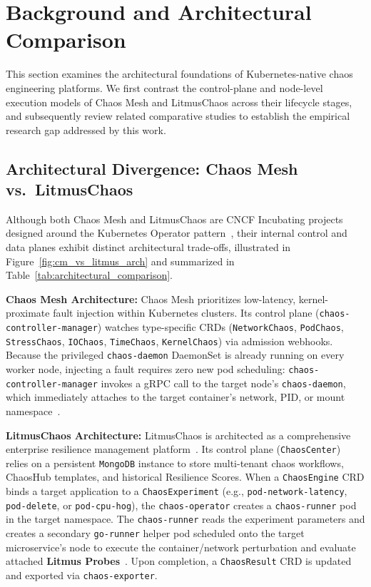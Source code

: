 \section{Background and Architectural Comparison}
\label{sec:background}

This section examines the architectural foundations of Kubernetes-native chaos engineering platforms. We first contrast the control-plane and node-level execution models of Chaos Mesh and LitmusChaos across their lifecycle stages, and subsequently review related comparative studies to establish the empirical research gap addressed by this work.

\subsection{Architectural Divergence: Chaos Mesh vs.\ LitmusChaos}
Although both Chaos Mesh and LitmusChaos are CNCF Incubating projects designed around the Kubernetes Operator pattern~\cite{owotogbe2026tenyears, onkalo2025improving}, their internal control and data planes exhibit distinct architectural trade-offs, illustrated in Figure~\ref{fig:cm_vs_litmus_arch} and summarized in Table~\ref{tab:architectural_comparison}.





\textbf{Chaos Mesh Architecture:} Chaos Mesh prioritizes low-latency, kernel-proximate fault injection within Kubernetes clusters. Its control plane (\texttt{chaos-controller-manager}) watches type-specific CRDs (\texttt{NetworkChaos}, \texttt{PodChaos}, \texttt{StressChaos}, \texttt{IOChaos}, \texttt{TimeChaos}, \texttt{KernelChaos}) via admission webhooks. Because the privileged \texttt{chaos-daemon} DaemonSet is already running on every worker node, injecting a fault requires zero new pod scheduling: \texttt{chaos-controller-manager} invokes a gRPC call to the target node's \texttt{chaos-daemon}, which immediately attaches to the target container's network, PID, or mount namespace~\cite{onkalo2025improving, owotogbe2026tenyears}.

\textbf{LitmusChaos Architecture:} LitmusChaos is architected as a comprehensive enterprise resilience management platform~\cite{onkalo2025improving, redkar2026enhancing, gurudu2026chaos}. Its control plane (\texttt{ChaosCenter}) relies on a persistent \texttt{MongoDB} instance to store multi-tenant chaos workflows, ChaosHub templates, and historical Resilience Scores. When a \texttt{ChaosEngine} CRD binds a target application to a \texttt{ChaosExperiment} (e.g., \texttt{pod-network-latency}, \texttt{pod-delete}, or \texttt{pod-cpu-hog}), the \texttt{chaos-operator} creates a \texttt{chaos-runner} pod in the target namespace. The \texttt{chaos-runner} reads the experiment parameters and creates a secondary \texttt{go-runner} helper pod scheduled onto the target microservice's node to execute the container/network perturbation and evaluate attached \textbf{Litmus Probes}~\cite{onkalo2025improving}. Upon completion, a \texttt{ChaosResult} CRD is updated and exported via \texttt{chaos-exporter}.


